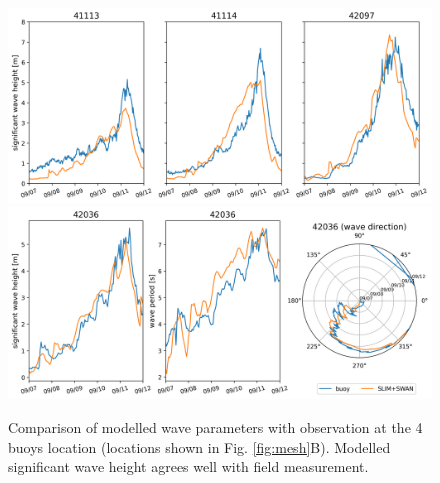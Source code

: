 \documentclass[preprint,12pt,authoryear]{elsarticle}
\begin{document}
\begin{figure}
    \centering
    \includegraphics[width=\textwidth]{fig/hsig_with_map_ww3.png}
    \includegraphics[width=\textwidth]{fig/waves_ww3_5km-00002.png}
    \caption{Comparison of modelled wave parameters with observation at the 4 buoys location (locations shown in Fig. \ref{fig:mesh}B). Modelled significant wave height agrees well with field measurement. }
    \label{fig:waves}
\end{figure}
\end{document}
